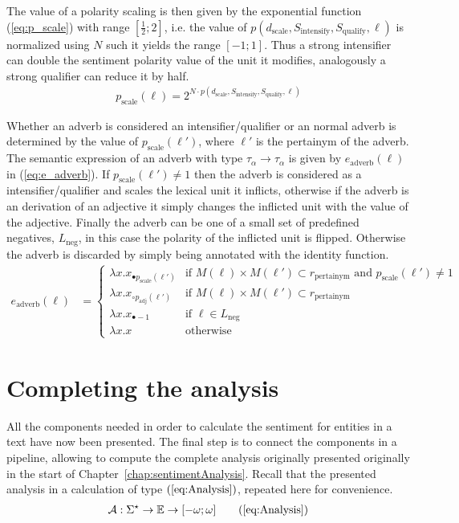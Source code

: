 The value of a polarity scaling is then given by the exponential function (\ref{eq:p_scale}) with range $\left[\frac{1}{2}; 2 \right]$, i.e. the value of $p(d_\mathrm{scale}, S_\mathrm{intensify}, S_\mathrm{qualify}, \ell)$ is normalized using $N$ such it yields the range $[-1; 1]$. Thus a strong intensifier can double the sentiment polarity value of the unit it modifies, analogously a strong qualifier can reduce it by half.  
\begin{align}
    p_\mathrm{scale}(\ell) = 2^{N \cdot p(d_\mathrm{scale}, S_\mathrm{intensify}, S_\mathrm{qualify}, \ell)}
    \label{eq:p_scale}
\end{align}

Whether an adverb is considered an intensifier/qualifier or an normal adverb is determined by the value of $p_\mathrm{scale}(\ell')$, where $\ell'$ is the pertainym of the adverb. The semantic expression of an adverb with type $\tau_\alpha \to \tau_\alpha$ is given by $e_\mathrm{adverb}(\ell)$ in (\ref{eq:e_adverb}). If $p_\mathrm{scale}(\ell') \neq 1$ then the adverb is considered as a intensifier/qualifier and scales the lexical unit it inflicts, otherwise if the adverb is an derivation of an adjective it simply changes the inflicted unit with the value of the adjective. Finally the adverb can be one of a small set of predefined negatives, $L_\mathrm{neg}$, in this case the polarity of the inflicted unit is flipped. Otherwise the adverb is discarded by simply being annotated with the identity function.
\begin{align}
	e_\mathrm{adverb}(\ell) &=
	\begin{cases}    
    \lambda x . x_{\bullet p_\mathrm{scale}(\ell')} & \text{if $M(\ell) \times M(\ell') \subset r_\mathrm{pertainym}$ and $p_\mathrm{scale}(\ell') \neq 1$} \\
    \lambda x . x_{\circ p_\mathrm{adj}(\ell')} & \text{if $M(\ell) \times M(\ell') \subset r_\mathrm{pertainym}$} \\
    \lambda x . x_{\bullet -1} & \text{if $\ell \in L_\mathrm{neg}$}\\
    \lambda x . x & \text{otherwise}
	\end{cases}
	\label{eq:e_adverb}
\end{align}

\section{Completing the analysis}
All the components needed in order to calculate the sentiment for entities in a text have now been presented. The final step is to connect the components in a pipeline, allowing to compute the complete analysis originally presented originally in the start of Chapter~\ref{chap:sentimentAnalysis}. Recall that the presented analysis in a calculation of type $(\ref{eq:Analysis})$, repeated here for convenience.
  \begin{align}
	 \mathcal{A}: \Sigma^\star \to \mathbb{E} \to [-\omega;\omega] \tag{\ref{eq:Analysis}}	 
  \end{align}


